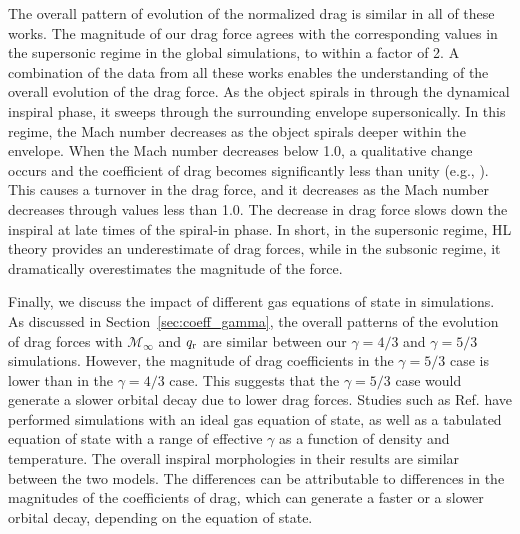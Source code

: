 The overall pattern of evolution of the normalized drag is similar in all of these works. The magnitude of our drag force agrees with the corresponding values in the supersonic regime in the global simulations, to within a factor of 2. A combination of the data from all these works enables the understanding of the overall evolution of the drag force. As the object spirals in through the dynamical inspiral phase, it sweeps through the surrounding envelope supersonically. In this regime, the Mach number decreases as the object spirals deeper within the envelope. When the Mach number decreases below 1.0, a qualitative change occurs and the coefficient of drag becomes significantly less than unity (e.g., \cite{Shima:1985,1999ApJ...513..252O}). This causes a turnover in the drag force, and it decreases as the Mach number decreases through values less than 1.0. The decrease in drag force slows down the inspiral at late times of the spiral-in phase. In short, in the supersonic regime, HL theory provides an underestimate of drag forces, while in the subsonic regime, it dramatically overestimates the magnitude of the force.

Finally, we discuss the impact of different gas equations of state in simulations. As discussed in Section~\ref{sec:coeff_gamma}, the overall patterns of the evolution of drag forces with $\mathcal{M}_\infty$ and $q_{\rm r}$ are similar between our $\gamma = 4/3$ and $\gamma = 5/3$ simulations. However, the magnitude of drag coefficients in the $\gamma = 5/3$ case is lower than in the $\gamma = 4/3$ case. This suggests that the $\gamma = 5/3$ case would generate a slower orbital decay due to lower drag forces. Studies such as Ref. \cite{Reichardt:2019b} have performed simulations with an ideal gas equation of state, as well as a tabulated equation of state with a range of effective $\gamma$ as a function of density and temperature. The overall inspiral morphologies in their results are similar between the two models. The differences can be attributable to differences in the magnitudes of the coefficients of drag, which can generate a faster or a slower orbital decay, depending on the equation of state.

